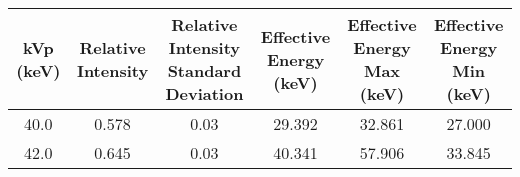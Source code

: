 \begin{tabular}{cccccc}
\toprule
 kVp (keV) &  Relative Intensity &  Relative Intensity Standard Deviation &  Effective Energy (keV) &  Effective Energy Max (keV) &  Effective Energy Min (keV) \\
\midrule
      40.0 &               0.578 &                                   0.03 &                  29.392 &                      32.861 &                      27.000 \\
      42.0 &               0.645 &                                   0.03 &                  40.341 &                      57.906 &                      33.845 \\
\bottomrule
\end{tabular}
